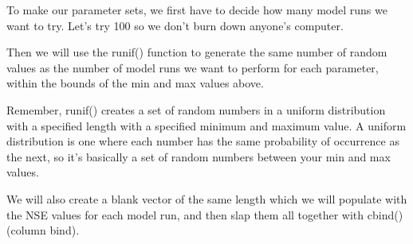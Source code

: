 \documentclass[
]{book}
\begin{document}
To make our parameter sets, we first have to decide how many model runs we want to try. Let's try 100 so we don't burn down anyone's computer.

Then we will use the runif() function to generate the same number of random values as the number of model runs we want to perform for each parameter, within the bounds of the min and max values above.

Remember, runif() creates a set of random numbers in a uniform distribution with a specified length with a specified minimum and maximum value. A uniform distribution is one where each number has the same probability of occurrence as the next, so it's basically a set of random numbers between your min and max values.

We will also create a blank vector of the same length which we will populate with the NSE values for each model run, and then slap them all together with cbind() (column bind).
\end{document}
